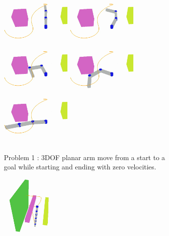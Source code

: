\documentclass[letterpaper, 10 pt, conference]{ieeeconf}  %
\begin{document}
\begin{figure}[t!]
	\centering
	\begin{subfigure}[b]{\textwidth}
	    \centering
		\includegraphics[height=2.45cm]{fig/planning_efficiency/3dof_1}
		\includegraphics[height=2.45cm]{fig/planning_efficiency/3dof_2}
		\includegraphics[height=2.45cm]{fig/planning_efficiency/3dof_3}
		\includegraphics[height=2.45cm]{fig/planning_efficiency/3dof_4}
		\includegraphics[height=2.45cm]{fig/planning_efficiency/3dof_5}
		\caption{\captionstyle Problem 1 : 3DOF planar arm move from a start to a goal while starting and ending with zero velocities.}
		\vspace{6pt}
		\label{fig:planning_efficiency:3dof:example}
	\end{subfigure}
	\begin{subfigure}[b]{\textwidth}
	    \centering
		\includegraphics[height=3cm]{fig/planning_efficiency/6dof_1}

\end{subfigure}
\end{figure}
\end{document}
